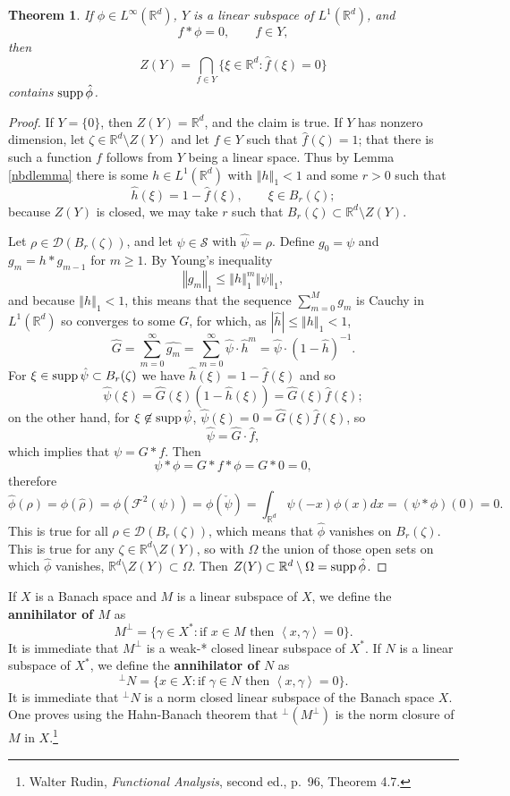 \documentclass{article}
\newcommand{\inner}[2]{\left\langle #1, #2 \right\rangle}
\newcommand{\supp}{\ensuremath\mathrm{supp}\,}
\newcommand{\norm}[1]{\left\Vert #1 \right\Vert}
\newtheorem{theorem}{Theorem}
\theoremstyle{definition}
\begin{document}
\begin{theorem}
If $\phi \in L^\infty(\mathbb{R}^d)$, $Y$ is a linear subspace of $L^1(\mathbb{R}^d)$, and 
\[
f*\phi = 0, \qquad f \in Y,
\]
then 
\[
Z(Y) =  \bigcap_{f \in Y} \{\xi \in \mathbb{R}^d: \hat{f}(\xi)=0\}
\]
contains $\supp \hat{\phi}$. 
\label{Ytheorem}
\end{theorem}
\begin{proof}
If $Y=\{0\}$, then  $Z(Y)=\mathbb{R}^d$, and the claim is true. If $Y$ has nonzero dimension, 
let $\zeta \in  \mathbb{R}^d \setminus Z(Y)$ and let  
$f \in Y$ such that $\hat{f}(\zeta)=1$; that there is such a function $f$ follows from $Y$ being a linear space.
Thus by Lemma \ref{nbdlemma} there is some $h \in L^1(\mathbb{R}^d)$ with
$\norm{h}_1 < 1$ and some $r>0$ such that 
\[
\hat{h}(\xi) =1-\hat{f}(\xi), \qquad \xi \in B_r(\zeta);
\]
because $Z(Y)$ is closed, we may take $r$ such that $B_r(\zeta) \subset \mathbb{R}^d \setminus Z(Y)$. 

Let $\rho \in \mathscr{D}(B_r(\zeta))$, and let $\psi \in \mathscr{S}$ with
$\hat{\psi}=\rho$. 
Define $g_0=\psi$ and $g_m = h * g_{m-1}$ for $m \geq 1$.
By Young's inequality
\[
\norm{g_m}_1 \leq  \norm{h}_1^m \norm{\psi}_1,
\]
and because $\norm{h}_1<1$, this means that the sequence $\sum_{m=0}^M g_m$ is Cauchy in $L^1(\mathbb{R}^d)$ so
converges to some $G$, for which, as $|\hat{h}| \leq \norm{h}_1 < 1$,
\[
\hat{G} = \sum_{m=0}^\infty \widehat{g_m} = \sum_{m=0}^\infty \hat{\psi}\cdot \hat{h}^m
=\hat{\psi} \cdot (1-\hat{h})^{-1}.
\]
For $\xi \in \supp \hat{\psi} \subset B_r(\zeta)$ we have
$\hat{h}(\xi)=1-\hat{f}(\xi)$ and so
\[
\hat{\psi}(\xi) = \hat{G}(\xi) (1-\hat{h}(\xi)) = \hat{G}(\xi)\hat{f}(\xi);
\]
on the other hand, for $\xi \not \in \supp \hat{\psi}$, $\hat{\psi}(\xi)=0=\hat{G}(\xi)\hat{f}(\xi)$, so
\[
\hat{\psi} = \hat{G} \cdot \hat{f},
\]
which implies that $\psi = G*f$. Then
\[
\psi*\phi = G*f*\phi = G*0 = 0,
\]
therefore
\[
\hat{\phi}(\rho) = \phi(\hat{\rho}) =\phi(\mathscr{F}^2(\psi))= \phi(\check{\psi}) = \int_{\mathbb{R}^d} \psi(-x) \phi(x) dx
=(\psi*\phi)(0)=0.
\]
This is true for all $\rho \in \mathscr{D}(B_r(\zeta))$, which 
means that $\hat{\phi}$ vanishes on $B_r(\zeta)$. This is true for any $\zeta \in \mathbb{R}^d \setminus Z(Y)$, 
so with $\Omega$ the union of those open sets on which $\hat{\phi}$ vanishes, 
$\mathbb{R}^d \setminus Z(Y) \subset \Omega$. Then
$Z(Y) \subset \mathbb{R}^d \setminus \Omega = \supp \hat{\phi}$. 
\end{proof}

If $X$ is a Banach space and $M$ is a linear subspace of $X$, we define the \textbf{annihilator of $M$}
as
\[
M^\perp = \{\gamma \in X^*: \textrm{if $x \in M$ then $\inner{x}{\gamma}=0$}\}.
\]
It is immediate that $M^\perp$ is a weak-* closed linear subspace of $X^*$. 
If $N$ is a linear subspace of $X^*$, we define the \textbf{annihilator of $N$} as
\[
^\perp N = \{x \in X: \textrm{if $\gamma \in N$ then $\inner{x}{\gamma}=0$}\}.
\]
It is immediate that $^\perp N$ is a norm closed linear subspace of the Banach space $X$. One proves using the Hahn-Banach theorem that
$^\perp(M^\perp)$ is the norm closure of $M$ in $X$.\footnote{Walter Rudin, {\em Functional Analysis}, second ed.,
p.~96, Theorem 4.7.}
\end{document}
